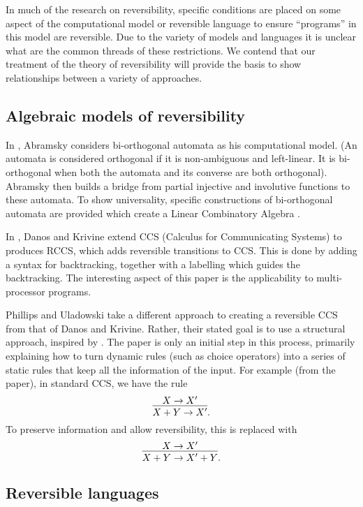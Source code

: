 In much of the research on reversibility, specific conditions are placed on some aspect of the
computational model or reversible language to ensure ``programs'' in this model are reversible. Due
to the variety of models and languages it is unclear what are the common threads of these restrictions.
We contend that our treatment of the theory of reversibility will provide the basis to show
relationships between a variety of approaches.

\subsection{Algebraic models of reversibility}
\label{subsec:algebraic_models_of_reversibility}
In \cite{abramsky05:reversible}, Abramsky considers bi-orthogonal automata as his computational
model. (An automata is considered orthogonal if it is non-ambiguous and left-linear. It is
bi-orthogonal when both the automata and its converse are both orthogonal). Abramsky then builds a
bridge from partial injective and involutive functions to these automata. To show universality,
specific constructions of bi-orthogonal automata are provided which create a Linear Combinatory Algebra
\cite{abramsky02:GOI}.

In \cite{danos2004reversible}, Danos and Krivine extend CCS (Calculus for Communicating Systems)
\cite{milner1980calculus,milner1989communication} to produces RCCS, which adds reversible
transitions to CCS. This is done by adding a syntax for backtracking, together with a labelling
which guides the backtracking. The interesting aspect of this paper is the applicability to
multi-processor programs.

Phillips and Uladowski \cite{phillips2006operational} take a different approach to creating a
reversible CCS from that of Danos and Krivine. Rather, their stated goal is to use a structural
approach, inspired by \cite{abramsky05:reversible}. The paper is only an initial step in this
process, primarily explaining how to turn dynamic rules (such as choice operators) into a series of
static rules that keep all the information of the input. For example (from the paper), in standard
CCS, we have the rule
\[
  \infer{X+Y \to X'}{X\to X'}.
\]
To preserve information and allow reversibility, this is replaced with
\[
  \infer{X+Y \to X' +Y}{X\to X'}.
\]


\subsection{Reversible languages}
\label{subsec:reversible_languages}

